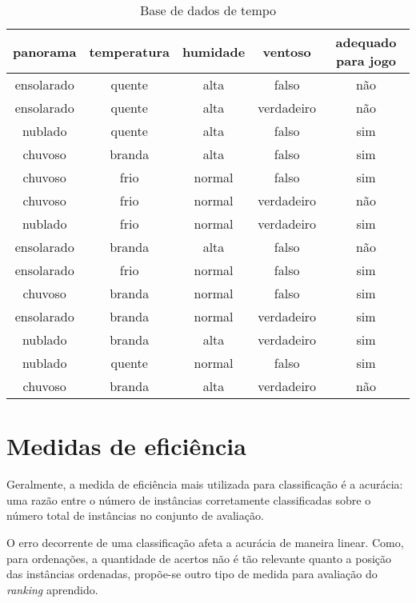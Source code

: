 \begin{table}[h!]
    \centering
    \begin{tabular}{ccccc}
        \hline
        panorama & temperatura & humidade & ventoso & adequado para jogo \\
        \hline
        ensolarado & quente & alta & falso & não \\
        ensolarado & quente & alta & verdadeiro & não \\
        nublado & quente & alta & falso & sim \\
        chuvoso & branda & alta & falso & sim \\
        chuvoso & frio & normal & falso & sim \\
        chuvoso & frio & normal & verdadeiro & não \\
        nublado & frio & normal & verdadeiro & sim \\
        ensolarado & branda & alta & falso & não \\
        ensolarado & frio & normal & falso & sim \\
        chuvoso & branda & normal & falso & sim \\
        ensolarado & branda & normal & verdadeiro & sim \\
        nublado & branda & alta & verdadeiro & sim \\
        nublado & quente & normal & falso & sim \\
        chuvoso & branda & alta & verdadeiro & não \\
        \hline
    \end{tabular}

    \caption{Base de dados de tempo}
\end{table}

\section{Medidas de eficiência}

Geralmente, a medida de eficiência mais utilizada para classificação é a acurácia: uma razão entre o número de instâncias corretamente classificadas sobre o número total de instâncias no conjunto de avaliação.

O erro decorrente de uma classificação afeta a acurácia de maneira linear. Como, para ordenações, a quantidade de acertos não é tão relevante quanto a posição das instâncias ordenadas, propõe-se outro tipo de medida para avaliação do \emph{ranking} aprendido.

